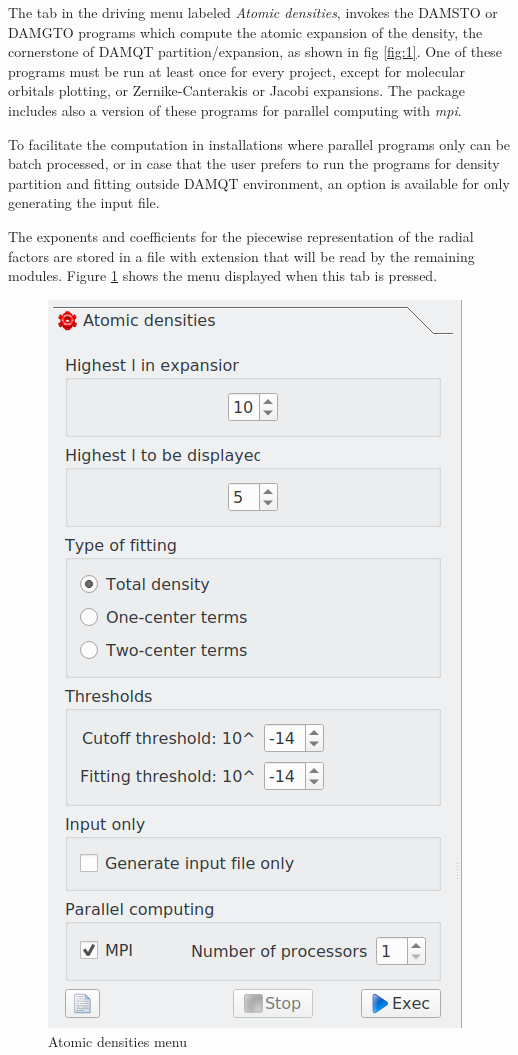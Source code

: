 \documentclass[10pt]{article}
\begin{document}
\begin{center}
\begin{minipage}{.59\linewidth}

The tab in the driving menu labeled {\it Atomic densities}, invokes the
DAMSTO or DAMGTO programs which compute the atomic expansion of the density, the
cornerstone of DAMQT partition/expansion, as shown in fig \ref{fig:1}. One of these programs must be run at
least once for every project, except for molecular orbitals plotting, or Zernike-Canterakis or Jacobi
expansions. The package 
includes also a version of these programs for parallel computing with {\it 
mpi}. 

To facilitate the computation in installations where parallel programs only can be 
batch processed, or in case that the user prefers to run the 
programs for density partition and fitting
outside DAMQT environment, an option is available for only generating the input file. 

The exponents and coefficients for the piecewise
representation of the radial factors are stored in a file with extension 
\damqt{ } that will be read by the remaining modules. Figure \ref{fig:2_2_1}
shows the menu displayed when this tab is pressed.

\end{minipage}
\begin{minipage}{.4\linewidth}

\begin{figure}[H]
\begin{center}
\includegraphics[width=.55\linewidth]{damqt320_atomic_densities.png}
\end{center}
\caption{Atomic densities menu \label{fig:2_2_1}}
\end{figure}

\end{minipage}
\end{center}
\end{document}
